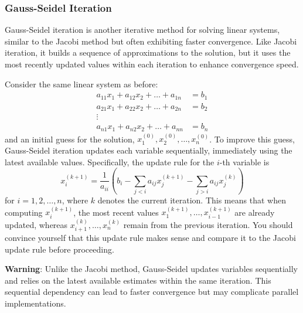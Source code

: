 \subsubsection{Gauss-Seidel Iteration}
Gauss-Seidel iteration is another iterative method for solving linear systems, similar to the Jacobi method but often exhibiting faster convergence. Like Jacobi iteration, it builds a sequence of approximations to the solution, but it uses the most recently updated values within each iteration to enhance convergence speed.

Consider the same linear system as before:
\begin{align*}
    a_{11}x_1 + a_{12}x_2 + \dots + a_{1n} & = b_1 \\
    a_{21}x_1 + a_{22}x_2 + \dots + a_{2n} & = b_2 \\
    \vdots & \\
    a_{n1}x_1 + a_{n2}x_2 + \dots + a_{nn} & = b_n
\end{align*}
and an initial guess for the solution, $ x_1^{(0)}, x_2^{(0)}, \dots, x_n^{(0)} $. To improve this guess, Gauss-Seidel iteration updates each variable sequentially, immediately using the latest available values. Specifically, the update rule for the $i$-th variable is
\begin{equation*}
    x_i^{(k+1)} = \frac{1}{a_{ii}} \left( b_i - \sum_{j < i} a_{ij}x_j^{(k+1)} - \sum_{j > i} a_{ij}x_j^{(k)} \right)
\end{equation*}
for $ i = 1, 2, \dots, n $, where $ k $ denotes the current iteration. This means that when computing $ x_i^{(k+1)} $, the most recent values $ x_1^{(k+1)}, \dots, x_{i-1}^{(k+1)} $ are already updated, whereas $ x_{i+1}^{(k)}, \dots, x_n^{(k)} $ remain from the previous iteration. You should convince yourself that this update rule makes sense and compare it to the Jacobi update rule before proceeding.

\begin{warningBox}
    \textbf{Warning}: Unlike the Jacobi method, Gauss-Seidel updates variables sequentially and relies on the latest available estimates within the same iteration. This sequential dependency can lead to faster convergence but may complicate parallel implementations.
\end{warningBox}

